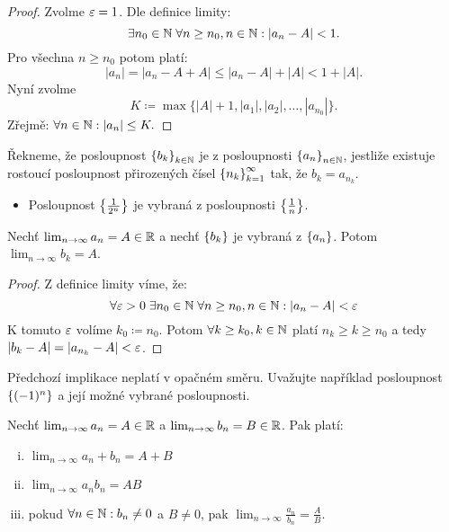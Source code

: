\begin{proof}
    Zvolme $\varepsilon = 1$. Dle definice limity:
    $$\exists n_0 \in \mathbb{N} \; \forall n \geq n_0,n \in \mathbb{N}: |a_n - A| < 1.$$
    Pro všechna $n \geq n_0$ potom platí: 
    $$|a_n| = |a_n - A + A| \leq |a_n - A| + |A| < 1 + |A|.$$
    Nyní zvolme $$K \coloneqq \max{\{|A|+1, |a_1|, |a_2|, \dots, |a_{n_0}|\}}.$$
    Zřejmě: $\forall n \in \mathbb{N}: |a_n| \leq K.$
\end{proof}

\begin{definition}
    Řekneme, že posloupnost $\left\{b_k\right\}_{k \in \mathbb{N}}$ je  z posloupnosti
    $\left\{a_n\right\}_{n \in \mathbb{N}}$, jestliže existuje rostoucí posloupnost přirozených
    čísel $\left\{n_k\right\}_{k=1}^\infty$ tak, že $b_k = a_{n_k}$.
\end{definition}

\begin{remark}
    \leavevmode
    \begin{itemize}
        \item Posloupnost $\left\{\frac{1}{2^n}\right\}$ je vybraná z posloupnosti 
            $\left\{\frac{1}{n}\right\}$.
    \end{itemize}
\end{remark}

\begin{theorem}
    \label{th:vybranalimita}
    Nechť $\lim_{n \to \infty} a_n = A \in \mathbb{R}$ a nechť $\left\{b_k\right\}$ je vybraná z
    $\left\{a_n\right\}$. Potom $\lim_{n\to\infty} b_k = A$.
\end{theorem}

\begin{proof}
    Z definice limity víme, že:
    $$\forall \varepsilon > 0 \; \exists n_0 \in \mathbb{N} \; \forall n \geq n_0,n\in \mathbb{N}: |a_n - A| < \varepsilon$$
    K tomuto $\varepsilon$ volíme $k_0 \coloneqq n_0$. Potom $\forall k \geq k_0, k \in \mathbb{N}$ platí
    $n_k \geq k \geq n_0$ a tedy $|b_k - A| = |a_{n_k} -A| < \varepsilon$.
\end{proof}

\begin{remark}
    Předchozí implikace neplatí v opačném směru. 
    Uvažujte například posloupnost $\left\{(-1)^n\right\}$ a její
    možné vybrané posloupnosti.
\end{remark}

\begin{theorem}
    \label{th:voal}
    Nechť $\lim_{n\to\infty}a_n = A \in \mathbb{R}$ a $\lim_{n\to\infty}b_n = B \in \mathbb{R}$.
    Pak platí:
    \begin{enumerate}[i.]
        \item $\lim_{n \to \infty} a_n + b_n = A + B$
        \item $\lim_{n \to \infty} a_nb_n = AB$
        \item pokud $\forall n \in \mathbb{N}: b_n \neq 0$ a $B \neq 0$, pak
            $\lim_{n \to \infty} \frac{a_n}{b_n} = \frac{A}{B}.$
    \end{enumerate}
\end{theorem}

